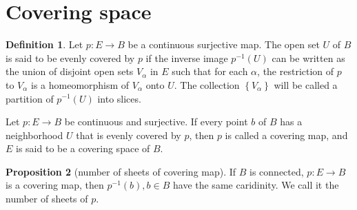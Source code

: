 \documentclass[12pt,a4paper]{book}
\newenvironment{prooff}{{\noindent\it\textcolor{cyan!40!black}{Proof}:}\,}{\par}
\theoremstyle{definition}
\newtheorem{defn}{Definition}[section]
\newtheorem{theo}[defn]{Theorem}
\newtheorem{prop}[defn]{Proposition}
\begin{document}
\section{Covering space}
\begin{defn}
    Let $p: E \rightarrow B$ be a continuous surjective map. The open set $U$ of $B$ is said to be evenly covered by $p$ if the inverse image $p^{-1}(U)$ can be written as the union of disjoint open sets $V_\alpha$ in $E$ such that for each $\alpha$, the restriction of $p$ to $V_\alpha$ is a homeomorphism of $V_\alpha$ onto $U$. The collection $\left\{V_\alpha\right\}$ will be called a partition of $p^{-1}(U)$ into slices.

    Let $p: E \rightarrow B$ be continuous and surjective. If every point $b$ of $B$ has a neighborhood $U$ that is evenly covered by $p$, then $p$ is called a covering map, and $E$ is said to be a covering space of $B$.
\end{defn}
\begin{prop}[number of sheets of covering map]
    If $B$ is connected, $p:E\rightarrow B$ is a covering map, then $p^{-1}(b),b\in B$ have the same caridinity. We call it the number of sheets of $p$.
\end{prop}



\end{document}
